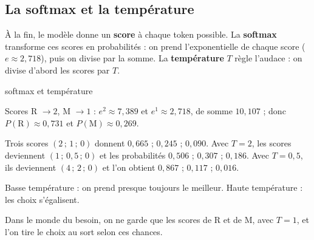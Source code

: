 \documentclass[fontsize=10pt,paper=a4,parskip=half-]{scrartcl}
\newcommand{\q}[1]{\og #1\fg{}}
\begin{document}
\subsection{La softmax et la température}
\label{sec:softmax}
À la fin, le modèle donne un \textbf{score} à chaque token possible. La \textbf{softmax}
transforme ces scores en probabilités : on prend l'exponentielle de chaque score
($e \approx 2,718$), puis on divise par la somme. La \textbf{température} $T$ règle
l'audace : on divise d'abord les scores par $T$.

\begin{calcul}{softmax et température}
\begin{minipage}{0.52\linewidth}
\raggedright
Scores R $\to 2$, M $\to 1$ : $e^2 \approx 7,389$ et $e^1 \approx 2,718$, de somme
$10,107$ ; donc $P(\text{R}) \approx 0,731$ et $P(\text{M}) \approx 0,269$.

Trois scores $(2\,;\,1\,;\,0)$ donnent $0,665$ ; $0,245$ ; $0,090$. Avec $T=2$, les
scores deviennent $(1\,;\,0,5\,;\,0)$ et les probabilités $0,506$ ; $0,307$ ; $0,186$.
Avec $T=0,5$, ils deviennent $(4\,;\,2\,;\,0)$ et l'on obtient $0,867$ ; $0,117$ ; $0,016$.
\end{minipage}\hfill
\begin{minipage}{0.44\linewidth}
\centering
{}
\end{minipage}
\smallskip

Basse température : on prend presque toujours le meilleur. Haute température : les
choix s'égalisent.
\end{calcul}

Dans le monde du besoin, on ne garde que les scores de \q{R} et de \q{M}, avec $T=1$, et
l'on tire le choix au sort selon ces chances.
\end{document}
